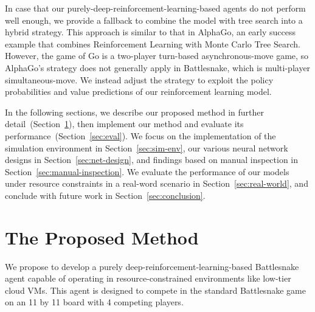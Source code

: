 \documentclass[conference]{IEEEtran}
\newcommand{\todo}[1]{\textcolor{red}{[ #1 ]}}
\newcommand{\instruction}[1]{\textcolor{orange}{#1}}
\renewcommand{\todo}[1]{} %
\renewcommand{\instruction}[1]{} %
\begin{document}
\todo{explain the advantages and disadvantages of the existing methods}

\todo{explain the differences and characteristics of your approach relative to
    the existing methods
}

In case that our purely-deep-reinforcement-learning-based agents do not perform
well enough,
we provide a fallback to combine the model with tree search into a hybrid
strategy. This approach is similar to that in AlphaGo,
an early success example that combines Reinforcement Learning with Monte Carlo
Tree Search. However,
the game of Go is a two-player turn-based asynchronous-move game,
so AlphaGo's strategy does not generally apply in Battlesnake,
which is multi-player simultaneous-move.
We instead adjust the strategy to exploit the policy probabilities and value
predictions of our reinforcement learning model.

\todo{briefly introduce the characteristics of your method}

In the following sections,
we describe our proposed method in further detail~(Section~\ref{sec:method}),
then implement our method and evaluate its performance~(Section~\ref{sec:eval}).
We focus on the implementation of the simulation environment in
Section~\ref{sec:sim-env},
our various neural network designs in Section~\ref{sec:net-design},
and findings based on manual inspection in Section~\ref{sec:manual-inspection}.
We evaluate the performance of our models under resource constraints in a real-word scenario in Section~\ref{sec:real-world},
and conclude with future work in Section~\ref{sec:conclusion}.

\todo{present the organization of the subsequent part of the article}

\section{The Proposed Method}\label{sec:method}

\instruction{In this part, you need to describe your method in detail.
    According to the specific problems considered in the article and the
    characteristics of the method designed,
    the content that may be included is problem statement and assumptions,
    initial data analysis,
    an introduction to the general procedure of your method and the
    corresponding flow chart, etc.
}

We propose to develop a purely deep-reinforcement-learning-based Battlesnake
agent capable of operating in resource-constrained environments like low-tier
cloud VMs.
This agent is designed to compete in the standard Battlesnake game on an 11 by
11 board with 4 competing players.
\end{document}
